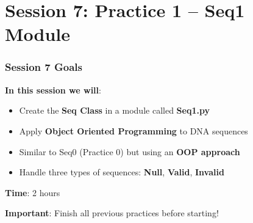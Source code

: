 \documentclass[xcolor=table]{beamer}
\begin{document}

\section{Session 7: Practice 1 -- Seq1 Module}

\begin{frame}
\frametitle{Session 7 Goals}

\textbf{In this session we will}:

\begin{itemize}
\item Create the \textbf{Seq Class} in a module called \textbf{Seq1.py}
\item Apply \textbf{Object Oriented Programming} to DNA sequences
\item Similar to Seq0 (Practice 0) but using an \textbf{OOP approach}
\item Handle three types of sequences: \textbf{Null}, \textbf{Valid}, \textbf{Invalid}
\end{itemize}

\vspace{0.5cm}

\textbf{Time}: 2 hours

\vspace{0.3cm}

\textbf{Important}: Finish all previous practices before starting!

\end{frame}
\end{document}
